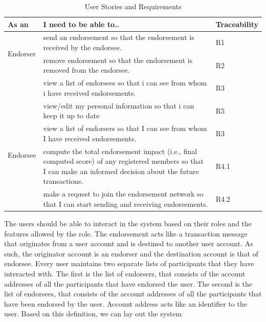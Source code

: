 \begin{center} \label{table:userstories} 
	\begin{table}
	\begin{tabular} {| l | p{8cm} | l |}
		\hline
		\textbf{As an}  & \textbf{I need to be able to..}   & \textbf{Traceability} \\
		\hline
		\multirow{2}{*}{Endorser} & send an endorsement so that the endorsement
		is received by the endorsee.& R1
		\\\cline{2-3} 
		& remove endorsement so that the endorsement is removed from the
		endorsee.  & R2 \\\cline{2-3}
		& view a list of endorsees so that i can see from whom i have received 
		endorsements.& R3 \\\cline{2-3}
		& view/edit my personal information so that i can keep it up to
		date& R5 \\\cline{2-3}
		\hline
		\multirow{2}{*}{Endorsee} & view a list of endorsers so that I can see
		from whom I have received endorsements.& R3 \\\cline{2-3}
		\hline
		\multirow{2}{*}{other users} & compute the total endorsement
		impact (i.e., final computed score) of any registered members so that I
		can make an informed decision about the future transactions.
		& R4.1 \\\cline{2-3}
		& make a request to join the endorsement network so that I can start
		sending and receiving endorsements.  
		& R4.2 \\\cline{2-3}
		\hline
	\end{tabular}
	\caption{User Stories and Requirements}
\end{table}
\end{center}
\vspace{-15mm}
The users should be able to interact in the system based on their roles and the
features allowed by the role. The endorsement acts like a transaction message
that originates from a user account and is destined to another user account. As
such, the originator account is an endorser and the destination account is that
of endorsee. Every user maintains two separate lists of participants that they
have interacted with. The first is the list of endorsers, that consists of the
account addresses of all the participants that have endorsed the user. The
second is the list of endorsees, that consists of the account addresses of all
the participants that have been endorsed by the user. Account address acts like
an identifier to the user. Based on this definition, we can lay out the system
